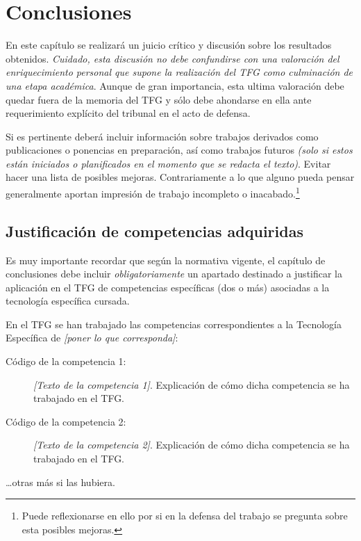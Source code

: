 \chapter{Conclusiones}
\label{cap:Conclusiones}

En este capítulo se realizará un juicio crítico y discusión sobre los resultados obtenidos. \emph{Cuidado, esta discusión no debe confundirse con una valoración del enriquecimiento personal que supone la realización del TFG como culminación de una etapa académica}. Aunque de gran importancia, esta ultima valoración debe quedar fuera de la memoria del TFG y sólo debe ahondarse en ella ante requerimiento explícito del tribunal en el acto de defensa.

Si es pertinente deberá incluir información sobre trabajos derivados como publicaciones o ponencias en preparación, así como trabajos futuros \emph{(solo si estos están iniciados o planificados en el momento que se redacta el texto)}. Evitar hacer una lista de posibles mejoras. Contrariamente a lo que alguno pueda pensar generalmente aportan impresión de trabajo incompleto o inacabado.\footnote{Puede reflexionarse en ello por si en la defensa del trabajo se pregunta sobre esta posibles mejoras.}


\section{Justificación de competencias adquiridas}
Es muy importante recordar que según la normativa vigente, el capítulo de conclusiones debe incluir \emph{obligatoriamente} un apartado destinado a justificar la aplicación en el TFG de competencias específicas (dos o más) asociadas a la tecnología específica cursada.

En el TFG se han trabajado las competencias correspondientes a la Tecnología Específica de \emph{[poner lo que corresponda]}:

\begin{description}
\item[Código de la competencia 1:] \emph{[Texto de la competencia 1]}. Explicación de cómo dicha competencia se ha trabajado en el TFG.
\item[Código de la competencia 2:] \emph{[Texto de la competencia 2]}. Explicación de cómo dicha competencia se ha trabajado en el TFG.
\end{description}

\dots otras más si las hubiera.


